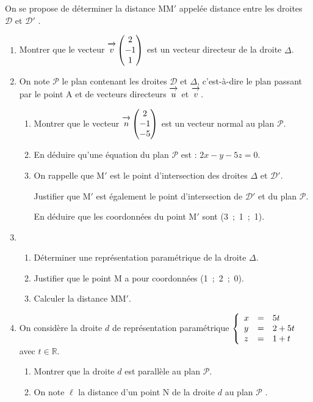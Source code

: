 \documentclass[10pt,a4paper]{article}
\newcommand{\R}{\mathbb{R}}
\newcommand{\vect}[1]{\overrightarrow{\,\mathstrut#1\,}}
\begin{document}
On se propose de déterminer la distance MM$'$ appelée \og distance entre les droites $\mathcal{D}$ et $\mathcal{D}'$ \fg.
\begin{enumerate}[resume]
\item Montrer que le vecteur $\vect{v}\begin{pmatrix}2\\- 1\\1\end{pmatrix}$ est un vecteur directeur de la droite $\Delta$.
\item On note $\mathcal{P}$ le plan contenant les droites $\mathcal{D}$ et $\Delta$, c'est-à-dire le plan passant par le point A et de vecteurs directeurs $\vect{u}$ et $\vect{v}$.
	\begin{enumerate}
		\item Montrer que le vecteur $\vect{n}\begin{pmatrix}2\\-1\\-5 \end{pmatrix}$ est un vecteur normal au plan $\mathcal{P}$.
		\item En déduire qu'une équation du plan $\mathcal{P}$ est : $2x - y - 5z = 0$.
		\item On rappelle que M$'$ est le point d'intersection des droites $\Delta$ et $\mathcal{D}'$.
		
Justifier que M$'$ est également le point d'intersection de $\mathcal{D}'$ et du plan $\mathcal{P}$.
		
En déduire que les coordonnées du point M$'$ sont (3~;~1~;~1).
	\end{enumerate}
\item 
	\begin{enumerate}
		\item Déterminer une représentation paramétrique de la droite $\Delta$.
		\item Justifier que le point M a pour coordonnées (1~;~2~;~0).
		\item Calculer la distance MM$'$.
	\end{enumerate}
\item On considère la droite $d$ de représentation paramétrique $\left\{\begin{array}{l c l}
x &=& 5t\\y &=& 2 + 5t \\z&=&1 + t\end{array}\right.$ avec $t \in \R$.
	\begin{enumerate}
		\item Montrer que la droite $d$ est parallèle au plan $\mathcal{P}$.
		\item On note $\ell$ la distance d'un point N de la droite $d$ au plan $\mathcal{P}$ . 
		

\end{enumerate}
\end{enumerate}
\end{document}
